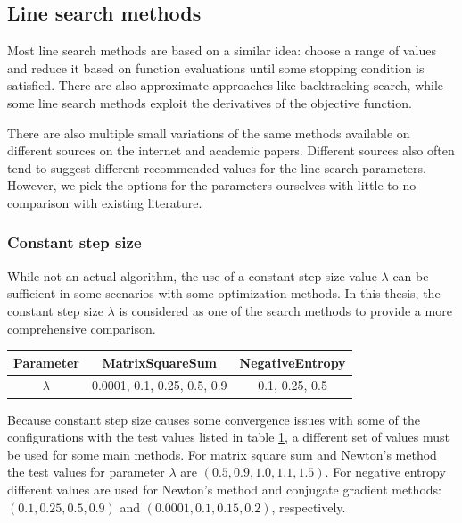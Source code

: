 \documentclass[english, 12pt, a4paper, sci, utf8, a-1b, online, table]{aaltothesis}
\begin{document}
\subsection{Line search methods}
\label{sect:line_search_methods}

Most line search methods are based on a similar idea: choose a range of values and reduce it based on function evaluations until some stopping condition is satisfied. There are also approximate approaches like backtracking search, while some line search methods exploit the derivatives of the objective function.

There are also multiple small variations of the same methods available on different sources on the internet and academic papers. Different sources also often tend to suggest different recommended values for the line search parameters. However, we pick the options for the parameters ourselves with little to no comparison with existing literature. \cite{book:convex_optimization} \cite{book:nonlinear_programming} 


\subsubsection{Constant step size}


While not an actual algorithm, the use of a constant step size value $\lambda$ can be sufficient in some scenarios with some optimization methods. In this thesis, the constant step size $\lambda$ is considered as one of the search methods to provide a more comprehensive comparison.

\begin{table}[H]
\label{tab:params_ConstantSearch}
\centering
{}
\begin{tabular}{|c|c|c|}
\hline
\rowcolor{gray!25}
Parameter & MatrixSquareSum & NegativeEntropy \\
\hline
$\lambda$ & 0.0001, 0.1, 0.25, 0.5, 0.9 & 0.1, 0.25, 0.5 \\
\hline
\end{tabular}
\end{table}

Because constant step size causes some convergence issues with some of the configurations with the test values listed in table \ref{tab:params_ConstantSearch}, a different set of values must be used for some main methods. For matrix square sum and Newton's method the test values for parameter $\lambda$ are $(0.5, 0.9, 1.0, 1.1, 1.5)$. For negative entropy different values are used for Newton's method and conjugate gradient methods: $(0.1, 0.25, 0.5, 0.9)$ and $(0.0001, 0.1, 0.15, 0.2)$, respectively.
\end{document}
